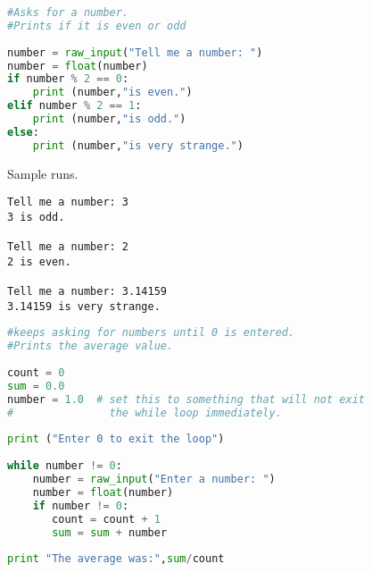 \lstset{basicstyle=\scriptsize, numbers=left, captionpos=b, tabsize=4}
\begin{lstlisting}[caption=even.py,language={Python},
xleftmargin=15pt, label=lst:even]
#Asks for a number.
#Prints if it is even or odd
 
number = raw_input("Tell me a number: ")
number = float(number)
if number % 2 == 0:
    print (number,"is even.")
elif number % 2 == 1:
    print (number,"is odd.")
else:
    print (number,"is very strange.")
\end{lstlisting}

Sample runs.
\scriptsize
\begin{verbatim}
Tell me a number: 3
3 is odd.

Tell me a number: 2
2 is even.

Tell me a number: 3.14159
3.14159 is very strange.
\end{verbatim}
\normalsize

\lstset{basicstyle=\scriptsize, numbers=left, captionpos=b, tabsize=4}
\begin{lstlisting}[caption=average1.py,language={Python},
xleftmargin=15pt, label=lst:average1]
#keeps asking for numbers until 0 is entered.
#Prints the average value.
 
count = 0
sum = 0.0
number = 1.0  # set this to something that will not exit
#               the while loop immediately.
 
print ("Enter 0 to exit the loop")
 
while number != 0:
    number = raw_input("Enter a number: ")
    number = float(number)
    if number != 0:
       count = count + 1
       sum = sum + number
 
print "The average was:",sum/count
\end{lstlisting}

